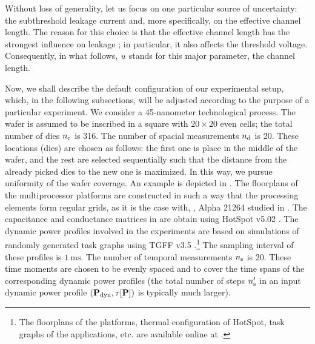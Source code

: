 Without loss of generality, let us focus on one particular source of uncertainty: the subthreshold leakage current and, more specifically, on the effective channel length. The reason for this choice is that the effective channel length has the strongest influence on leakage \cite{juan2011, juan2012}; in particular, it also affects the threshold voltage. Consequently, in what follows, $u$ stands for this major parameter, the channel length.


Now, we shall describe the default configuration of our experimental setup, which, in the following subsections, will be adjusted according to the purpose of a particular experiment. We consider a 45-nanometer technological process. The wafer is assumed to be inscribed in a square with $20 \times 20$ even cells; the total number of dies ${n_{\text{c}}}$ is 316. The number of spacial measurements ${n_{\text{d}}}$ is 20. These locations (dies) are chosen as follows: the first one is place in the middle of the wafer, and the rest are selected sequentially such that the distance from the already picked dies to the new one is maximized. In this way, we pursue uniformity of the wafer coverage. An example is depicted in . The floorplans of the multiprocessor platforms are constructed in such a way that the processing elements form regular grids, as it is the case with, \eg, Alpha 21264 studied in \cite{juan2011}. The capacitance and conductance matrices in  are obtain using HotSpot v5.02 \cite{hotspot}. The dynamic power profiles involved in the experiments are based on simulations of randomly generated task graphs using TGFF v3.5 \cite{dick1998}.\footnote{The floorplans of the platforms, thermal configuration of HotSpot, task graphs of the applications, etc. are available online at \cite{sources}.} The sampling interval of these profiles is $1~\text{ms}$. The number of temporal measurements ${n_\text{s}}$ is 20. These time moments are chosen to be evenly spaced and to cover the time spans of the corresponding dynamic power profiles (the total number of steps ${n_\text{s}'}$ in an input dynamic power profile $(\mathbf{P}_{\text{dyn}}, \tau[\mathbf{P}])$ is typically much larger).


